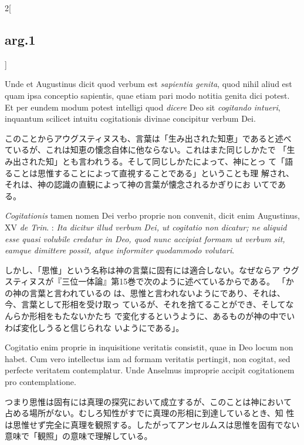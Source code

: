 \documentclass[paper=a4paper,fontsize=10pt,jafontsize=9pt,titlepage]{jlreq}
\begin{document}
\begin{paracol}{2}[\subsection{arg.1}]
\switchcolumn*

Unde et Augustinus dicit quod
 verbum est {\itshape sapientia genita}, quod nihil aliud est quam ipsa conceptio
 sapientis, quae etiam pari modo notitia genita dici potest. Et per
 eundem modum potest intelligi quod {\itshape dicere} Deo sit {\itshape cogitando intueri},
 inquantum scilicet intuitu cogitationis divinae concipitur verbum
 Dei.

\switchcolumn

このことからアウグスティヌスも、言葉は「生み出された知恵」であると述べ
 ているが、これは知恵の懐念自体に他ならない。これはまた同じしかたで
 「生み出された知」とも言われうる。そして同じしかたによって、神にとっ
 て「語ることは思惟することによって直視することである」ということも理
 解され、それは、神の認識の直観によって神の言葉が懐念されるかぎりにお
 いてである。

\switchcolumn*

{\itshape Cogitationis} tamen nomen Dei verbo proprie non convenit, dicit
 enim Augustinus, XV {\itshape de Trin}. : {\itshape Ita dicitur illud verbum Dei, ut
 cogitatio non dicatur; ne aliquid esse quasi volubile credatur in
 Deo, quod nunc accipiat formam ut verbum sit, eamque dimittere
 possit, atque informiter quodammodo volutari}.

\switchcolumn

しかし、「思惟」という名称は神の言葉に固有には適合しない。なぜならア
 ウグスティヌスが『三位一体論』第15巻で次のように述べているからである。
「かの神の言葉と言われているの
 は、思惟と言われないようにであり、それは、今、言葉として形相を受け取っ
 ているが、それを捨てることができ、そしてなんらか形相をもたないかたち
 で変化するというように、あるものが神の中でいわば変化しうると信じられな
 いようにである」。

\switchcolumn*

Cogitatio enim proprie
 in inquisitione veritatis consistit, quae in Deo locum non habet. Cum
 vero intellectus iam ad formam veritatis pertingit, non cogitat, sed
 perfecte veritatem contemplatur. Unde Anselmus improprie accipit
 cogitationem pro contemplatione.

\switchcolumn

つまり思惟は固有には真理の探究において成立するが、このことは神において
 占める場所がない。むしろ知性がすでに真理の形相に到達しているとき、知
 性は思惟せず完全に真理を観照する。したがってアンセルムスは思惟を固有でない
 意味で「観照」の意味で理解している。

\switchcolumn*[\subsection{ad.3}]


\end{paracol}
\end{document}
